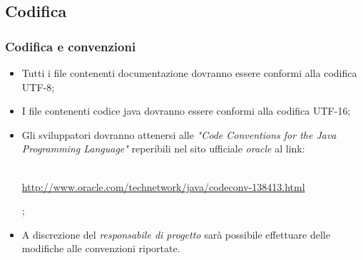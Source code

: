 \subsection{Codifica}
\subsubsection{Codifica e convenzioni}
\begin{itemize}

\item Tutti i file contenenti documentazione dovranno essere conformi alla codifica UTF-8;

\item I file contenenti codice java  dovranno essere conformi alla codifica UTF-16;

\item Gli sviluppatori dovranno attenersi alle \textit{"Code Conventions for the Java Programming Language"} reperibili nel sito ufficiale \textit{oracle} al link:\\ \\
\centerline{ \url{http://www.oracle.com/technetwork/java/codeconv-138413.html}};

\item A discrezione del \textit{responsabile di progetto} sarà possibile effettuare delle modifiche alle convenzioni riportate.
\end{itemize}